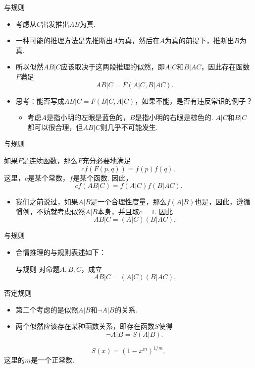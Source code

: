 \begin{frame}{与规则}
\begin{itemize}
    \item 考虑从$C$出发推出$AB$为真.
    \item 一种可能的推理方法是先推断出$A$为真，然后在$A$为真的前提下，推断出$B$为真.
    \item 所以似然$AB|C$应该取决于这两段推理的似然，即$A|C$和$B|AC$，因此存在函数$F$满足
    \[
        AB|C=F(A|C,B|AC).
    \]
    \item 思考：能否写成$AB|C = F(B|C, A|C)$，如果不能，是否有违反常识的例子？
    \begin{itemize}
        \item 考虑$A$是指小明的左眼是蓝色的，$B$是指小明的右眼是棕色的. $A|C$和$B|C$都可以很合理，但$AB|C$则几乎不可能发生.
    \end{itemize}
\end{itemize}
\end{frame}

\begin{frame}{与规则}
    \begin{theorem}
    如果$F$是连续函数，那么$F$充分必要地满足
        \[cf(F(p,q))=f(p)f(q),\]
        这里，$c$是某个常数，$f$是某个函数.
        因此，
        \[cf(AB|C)=f(A|C)f(B|AC).\]
    \end{theorem}
\begin{itemize}
    \item 我们之前说过，如果$A|B$是一个合理性度量，那么$f(A|B)$也是，因此，遵循惯例，不妨就考虑似然$A|B$本身，并且取$c=1$. 因此
        \[AB|C=(A|C)(B|AC).\]
\end{itemize}
\end{frame}

\begin{frame}{与规则}
\begin{itemize}
    \item 合情推理的与规则表述如下：
    \begin{block}{与规则}
    对命题$A,B,C$，成立
    \[AB|C=(A|C)(B|AC).\]
    \end{block}
\end{itemize}
\end{frame}


\begin{frame}{否定规则}
\begin{itemize}
    \item 第二个考虑的是似然$A|B$和$\neg A|B$的关系.
    \item 两个似然应该存在某种函数关系，即存在函数$S$使得
    \[\neg A|B=S(A|B).\]
    \end{itemize}
    \begin{theorem}
        \begin{equation*}
            S(x) = (1 - x^m)^{1/m},
        \end{equation*}
        这里的$m$是一个正常数.
    \end{theorem}
\end{frame}

